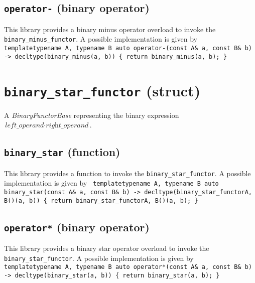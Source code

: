 \documentclass[oneside]{book}
\begin{document}
\subsection{\texttt{operator-} (binary operator)}
This library provides a binary minus operator overload to invoke the \texttt{binary\_minus\_functor}.
A possible implementation is given by\newline
\texttt{
template\textlangle typename A, typename B\textrangle\newline
auto operator-(const A\& a, const B\& b) -> decltype(binary\_minus(a, b))\newline
\{ return binary\_minus(a, b); \}
}

\section{\texttt{binary\_star\_functor} (struct)}
A \textit{BinaryFunctorBase} representing the binary expression $\textit{left\_operand} \cdot \textit{right\_operand}$.\newline

\subsection{\texttt{binary\_star} (function)}
This library provides a function to invoke the \texttt{binary\_star\_functor}.
A possible implementation is given by\newline
\texttt{
template\textlangle typename A, typename B\textrangle\newline
auto binary\_star(const A\& a, const B\& b) -> decltype(binary\_star\_functor\textlangle A, B\textrangle()(a, b))\newline
\{ return binary\_star\_functor\textlangle A, B\textrangle()(a, b); \}
}

\subsection{\texttt{operator*} (binary operator)}
This library provides a binary star operator overload to invoke the \texttt{binary\_star\_functor}.
A possible implementation is given by\newline
\texttt{
template\textlangle typename A, typename B\textrangle\newline
auto operator*(const A\& a, const B\& b) -> decltype(binary\_star(a, b))\newline
\{ return binary\_star(a, b); \}
}
\end{document}
